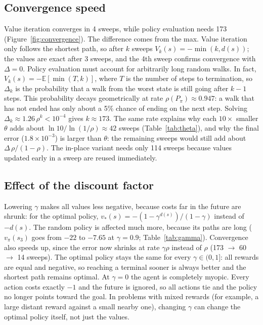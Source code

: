 \documentclass[11pt]{article}
\begin{document}
\subsection{Convergence speed}
Value iteration converges in 4 sweeps, while policy evaluation needs 173
(Figure~\ref{fig:convergence}). The difference comes from the max. Value iteration only follows
the shortest path, so after $k$ sweeps $V_k(s) = -\min(k, d(s))$; the values are exact after 3
sweeps, and the 4th sweep confirms convergence with $\Delta = 0$. Policy evaluation must account
for arbitrarily long random walks. In fact, $V_k(s) = -\mathbb{E}[\min(T, k)]$, where $T$ is
the number of steps to termination, so $\Delta_k$ is the probability that a walk from the worst
state is still going after $k - 1$ steps. This probability decays geometrically at rate
$\rho(P_\pi) \approx 0.947$: a walk that has not ended has only
about a 5\% chance of ending on the next step. Solving $\Delta_k \approx 1.26\,\rho^k < 10^{-4}$
gives $k \approx 173$. The same rate explains why each $10\times$ smaller $\theta$ adds about
$\ln 10 / \ln(1/\rho) \approx 42$ sweeps (Table~\ref{tab:theta}), and why the final error
($1.8 \times 10^{-3}$) is larger than $\theta$: the remaining sweeps would still add about
$\Delta\, \rho / (1 - \rho)$. The in-place variant needs only 114 sweeps because values updated early in a sweep are reused immediately.

\subsection{Effect of the discount factor}
Lowering $\gamma$ makes all values less
negative, because costs far in the future are shrunk: for the optimal policy,
$v_*(s) = -(1 - \gamma^{d(s)})/(1 - \gamma)$ instead of $-d(s)$. The random policy is affected
much more, because its paths are long ($v_\pi(s_3)$ goes from $-22$ to $-7.65$ at
$\gamma = 0.9$; Table~\ref{tab:gamma}). Convergence also speeds up, since the error now shrinks
at rate $\gamma\rho$ instead of $\rho$ (173 $\to$ 60 $\to$ 14 sweeps). The optimal policy stays
the same for every $\gamma \in (0, 1]$: all rewards are equal and negative, so reaching a
terminal sooner is always better and the shortest path remains optimal. At $\gamma = 0$ the
agent is completely myopic. Every action costs exactly $-1$ and the future is ignored, so all
actions tie and the policy no longer points toward the goal. In problems with mixed rewards
(for example, a large distant reward against a small nearby one), changing $\gamma$ can change
the optimal policy itself, not just the values.
\end{document}

